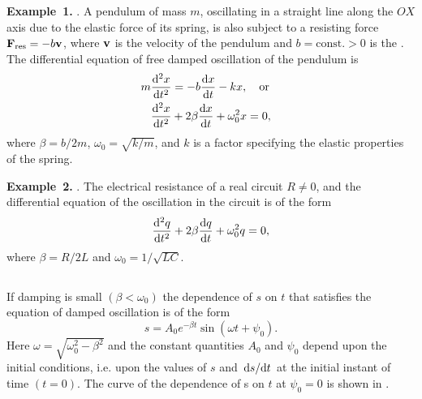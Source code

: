 \textbf{\large Example~1.}  . A pendulum of mass $m$, oscillating in a straight line along the $OX$ axis due to the elastic force of its spring, is also subject to a resisting force $\vb{F}_{\textrm{res}} = -b \vb{v}$, where $\vb{v}$ is the velocity of the pendulum and $b = \text{const.} > 0$ is the . The differential equation of free damped oscillation of the pendulum is
\begin{align*}%
m \dv[2]{x}{t} & = -b \dv{x}{t}  - kx, \qor \\
\dv[2]{x}{t} & + 2\beta \dv{x}{t} + \omega_{0}^{2} x = 0,
\end{align*}
where $\beta = b/2m$, $\omega_{0} = \sqrt{k/m}$, and $k$ is a factor specifying the elastic properties of the spring.

\textbf{\large Example~2.} . The electrical resistance of a real circuit $R \neq 0$, and the differential equation of the oscillation in the circuit  is of the form
\begin{equation*}%
\dv[2]{q}{t} + 2\beta \dv{q}{t} + \omega_{0}^{2} q = 0,
\end{equation*}
where $\beta = R/2L$ and $\omega_{0}= 1/\sqrt{LC}$.

\subsection{}\label{29.1.3} If damping is small $(\beta < \omega_{0})$ the dependence of $s$ on $t$ that satisfies the equation of damped oscillation  is of the form
\begin{equation*}%
s = A_{0} e^{-\beta t} \sin (\omega t + \psi_{0}).
\end{equation*}
Here $\omega = \sqrt{\omega_{0}^{2} - \beta^{2}}$ and the constant quantities $A_{0}$ and $\psi_{0}$ depend upon the initial conditions, i.e. upon the values of $s$ and $\dv*{s}{t}$ at the initial instant of time $(t = 0)$. The curve of the dependence of s on $t$ at $\psi_{0} = 0$ is shown in . 


